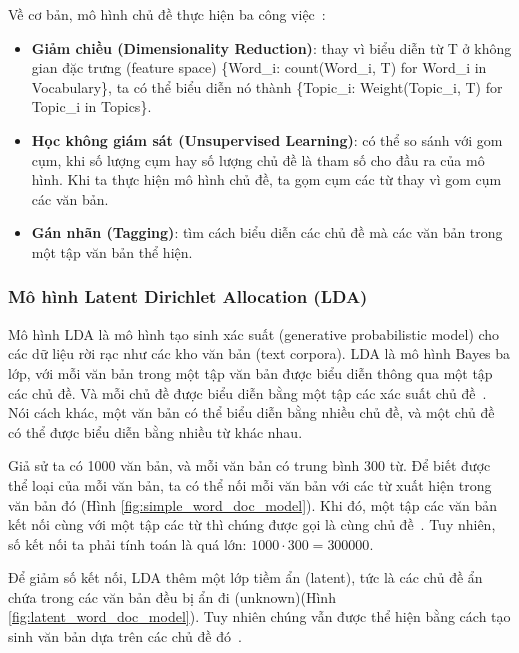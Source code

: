 Về cơ bản, mô hình chủ đề thực hiện ba công
việc~\cite{kapadiaTopicModelingPython2020}:

\begin{itemize}
	\item \textbf{Giảm chiều (Dimensionality Reduction)}: thay vì biểu diễn từ
		T ở không gian đặc trưng (feature space) \{Word\_i: count(Word\_i, T)
		for Word\_i in Vocabulary\}, ta có thể biểu diễn nó thành \{Topic\_i:
		Weight(Topic\_i, T) for Topic\_i in Topics\}.
	
	\item \textbf{Học không giám sát (Unsupervised Learning)}: có thể so sánh
		với gom cụm, khi số lượng cụm hay số lượng chủ đề là tham số cho đầu ra
		của mô hình. Khi ta thực hiện mô hình chủ đề, ta gọm cụm các từ thay vì
		gom cụm các văn bản.
	
	\item \textbf{Gán nhãn (Tagging)}: tìm cách biểu diễn các chủ đề mà các văn
		bản trong một tập văn bản thể hiện.
\end{itemize}

\subsubsection{Mô hình Latent Dirichlet Allocation (LDA)}
Mô hình LDA là mô hình tạo sinh xác suất (generative probabilistic model) cho
các dữ liệu rời rạc như các kho văn bản (text corpora). LDA là mô hình Bayes ba
lớp, với mỗi văn bản trong một tập văn bản được biểu diễn thông qua một tập các
chủ đề. Và mỗi chủ đề được biểu diễn bằng một tập các xác suất chủ
đề~\cite{bleiLatentDirichletAllocation2003}. Nói cách khác, một văn bản có thể
biểu diễn bằng nhiều chủ đề, và một chủ đề có thể được biểu diễn bằng nhiều từ
khác nhau.

Giả sử ta có 1000 văn bản, và mỗi văn bản có trung bình 300 từ. Để biết được thể
loại của mỗi văn bản, ta có thể nối mỗi văn bản với các từ xuất hiện trong văn
bản đó (Hình \ref{fig:simple_word_doc_model}). Khi đó, một tập các văn bản kết
nối cùng với một tập các từ thì chúng được gọi là cùng chủ
đề~\cite{ganegedaraIntuitiveGuideLatent2021}. Tuy nhiên, số kết nối ta phải tính
toán là quá lớn: $1000 \cdot 300 = 300000$.


Để giảm số kết nối, LDA thêm một lớp tiềm ẩn (latent), tức là các chủ đề ẩn chứa
trong các văn bản đều bị ẩn đi (unknown)(Hình \ref{fig:latent_word_doc_model}).
Tuy nhiên chúng vẫn được thể hiện bằng cách tạo sinh văn bản dựa trên các chủ đề
đó~\cite{tomarTopicModelingUsing2019}.

